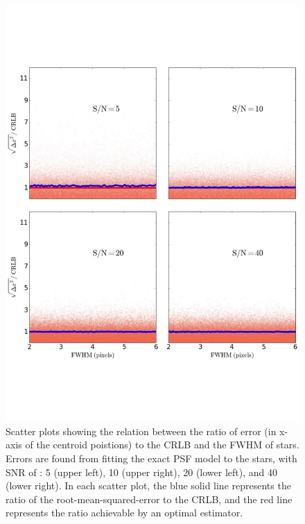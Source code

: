 \begin{figure}[p]~\\
\begin{center}
\includegraphics[width=0.65\linewidth]{figures/centroiding/new_fwhm_psf.pdf}
\caption{Scatter plots showing the relation between the ratio of error (in x-axis of the centroid poistions) to the CRLB and the FWHM of stars.
Errors are found from fitting the exact PSF model to the stars, with SNR  of : 5 (upper left), 10 (upper right), 20 (lower left), and 40 (lower right). In each scatter plot, the blue solid line represents the ratio of the root-mean-squared-error to the CRLB, and the red line represents the ratio achievable by an optimal estimator.}\label{5}
\end{center}
\end{figure}

